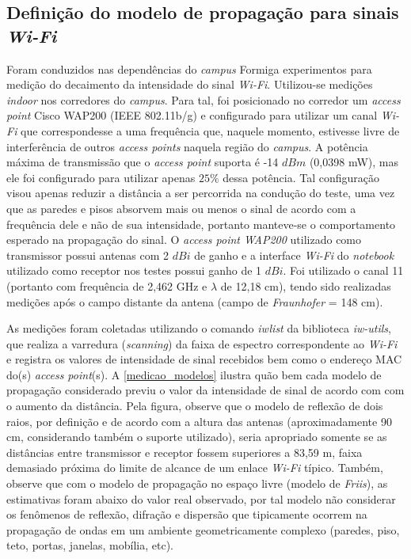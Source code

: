 \documentclass[
	12pt,				%
	twoside,			%
	a4paper,			%
	english,			%
	french,				%
	spanish,			%
	brazil				%
	]{abntex2}
\begin{document}
\subsection{\texorpdfstring{Definição do modelo de propagação para
sinais
\emph{Wi-Fi}}{Definição do modelo de propagação para sinais Wi-Fi}}\label{definiuxe7uxe3o-do-modelo-de-propagauxe7uxe3o-para-sinais-wi-fi}

Foram conduzidos nas dependências do \emph{campus} Formiga experimentos
para medição do decaimento da intensidade do sinal \emph{Wi-Fi}.
Utilizou-se medições \emph{indoor} nos corredores do \emph{campus}. Para
tal, foi posicionado no corredor um \emph{access point} Cisco WAP200
(IEEE 802.11b/g) e configurado para utilizar um canal \emph{Wi-Fi} que
correspondesse a uma frequência que, naquele momento, estivesse livre de
interferência de outros \emph{access points} naquela região do
\emph{campus}. A potência máxima de transmissão que o \emph{access
point} suporta é -14 \(dBm\) (0,0398 mW), mas ele foi configurado para
utilizar apenas \(25\%\) dessa potência. Tal configuração visou apenas
reduzir a distância a ser percorrida na condução do teste, uma vez que
as paredes e pisos absorvem mais ou menos o sinal de acordo com a
frequência dele e não de sua intensidade, portanto manteve-se o
comportamento esperado na propagação do sinal. O \emph{access point
WAP200} utilizado como transmissor possui antenas com 2 \(dBi\) de ganho
e a interface \emph{Wi-Fi} do \emph{notebook} utilizado como receptor
nos testes possui ganho de 1 \(dBi\). Foi utilizado o canal 11 (portanto
com frequência de 2,462 GHz e \(\lambda\) de 12,18 cm), tendo sido
realizadas medições após o campo distante da antena (campo de
\emph{Fraunhofer} = 148 cm).

As medições foram coletadas utilizando o comando \emph{iwlist} da
biblioteca \emph{iw-utils}, que realiza a varredura (\emph{scanning}) da
faixa de espectro correspondente ao \emph{Wi-Fi} e registra os valores
de intensidade de sinal recebidos bem como o endereço MAC do(s)
\emph{access point}(s). A \autoref{medicao_modelos} ilustra quão bem
cada modelo de propagação considerado previu o valor da intensidade de
sinal de acordo com com o aumento da distância. Pela figura, observe que
o modelo de reflexão de dois raios, por definição e de acordo com a
altura das antenas (aproximadamente 90 cm, considerando também o suporte
utilizado), seria apropriado somente se as distâncias entre transmissor
e receptor fossem superiores a 83,59 m, faixa demasiado próxima do
limite de alcance de um enlace \emph{Wi-Fi} típico. Também, observe que
com o modelo de propagação no espaço livre (modelo de \emph{Friis}), as
estimativas foram abaixo do valor real observado, por tal modelo não
considerar os fenômenos de reflexão, difração e dispersão que
tipicamente ocorrem na propagação de ondas em um ambiente
geometricamente complexo (paredes, piso, teto, portas, janelas, mobília,
etc).
\end{document}
